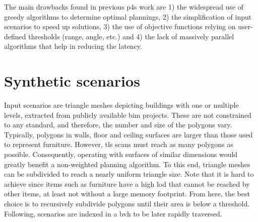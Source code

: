 The main drawbacks found in previous \acrshort{p4s} work are 1) the widespread use of greedy algorithms to determine optimal plannings, 2) the simplification of input scenarios to speed up solutions, 3) the use of objective functions relying on user-defined thresholds (range, angle, etc.) and 4) the lack of massively parallel algorithms that help in reducing the latency. 

\section{Synthetic scenarios}

Input scenarios are triangle meshes depicting buildings with one or multiple levels, extracted from publicly available \acrshort{bim} projects. These are not constrained to any standard, and therefore, the number and size of the polygons vary. Typically, polygons in walls, floor and ceiling surfaces are larger than those used to represent furniture. However, \acrshort{tls} scans must reach as many polygons as possible. Consequently, operating with surfaces of similar dimensions would greatly benefit a non-weighted planning algorithm. To this end, triangle meshes can be subdivided to reach a nearly uniform triangle size. Note that it is hard to achieve since items such as furniture have a high \acrshort{lod} that cannot be reached by other items, at least not without a large memory footprint. From here, the best choice is to recursively subdivide polygons until their area is below a threshold. Following, scenarios are indexed in a \acrshort{bvh} to be later rapidly traversed.

